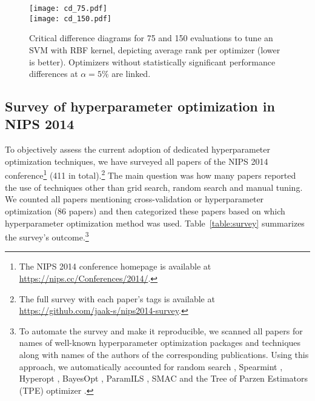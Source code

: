 
\begin{figure}[!h]
  \centering 
      \texttt{[image: cd\_75.pdf]} \\
      \texttt{[image: cd\_150.pdf]}
\caption{Critical difference diagrams for 75 and 150 evaluations to tune an SVM with RBF kernel, depicting average rank per optimizer (lower is better). Optimizers without statistically significant performance differences at $\alpha=5\%$ are linked.}\label{fig:benchmark}
\end{figure}

\begin{subappendices}

\section{Survey of hyperparameter optimization in NIPS 2014} \label{survey}
To objectively assess the current adoption of dedicated hyperparameter optimization techniques, we have surveyed all papers of the NIPS 2014 conference\footnote{The NIPS 2014 conference homepage is available at \url{https://nips.cc/Conferences/2014/}.} (411 in total).\footnote{The full survey with each paper's tags is available at \url{https://github.com/jaak-s/nips2014-survey}.} The main question was how many papers reported the use of techniques other than grid search, random search and manual tuning. We counted all papers mentioning cross-validation or hyperparameter optimization (86 papers) and then categorized these papers based on which hyperparameter optimization method was used. Table~\ref{table:survey} summarizes the survey's outcome.\footnote{To automate the survey and make it reproducible, we scanned all papers for names of well-known hyperparameter optimization packages and techniques along with names of the authors of the corresponding publications. Using this approach, we automatically accounted for random search \citep{bergstra2012random}, Spearmint \citep{snoek2012practical}, Hyperopt \citep{bergstra2013hyperopt}, BayesOpt \citep{martinez2014bayesopt}, ParamILS \citep{hutter2009paramils}, SMAC \citep{hutter2011sequential} and the Tree of Parzen Estimators (TPE) optimizer \citep{bergstra2011algorithms}.}


\end{subappendices}
